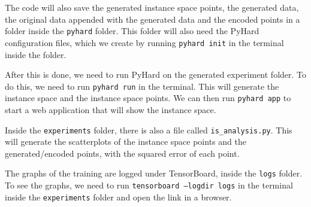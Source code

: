 The code will also save the generated instance space points, the generated data, the original data appended with the generated data and the encoded points in a folder inside the \texttt{pyhard} folder. This folder will also need the PyHard configuration files, which we create by running \texttt{pyhard init} in the terminal inside the folder.

After this is done, we need to run PyHard on the generated experiment folder. To do this, we need to run \texttt{pyhard run} in the terminal. This will generate the instance space and the instance space points. We can then run \texttt{pyhard app} to start a web application that will show the instance space.

Inside the \texttt{experiments} folder, there is also a file called \texttt{is\_analysis.py}. This will generate the scatterplots of the instance space points and the generated/encoded points, with the squared error of each point.

The graphs of the training are logged under TensorBoard, inside the \texttt{logs} folder. To see the graphs, we need to run \texttt{tensorboard --logdir logs} in the terminal inside the \texttt{experiments} folder and open the link in a browser.
